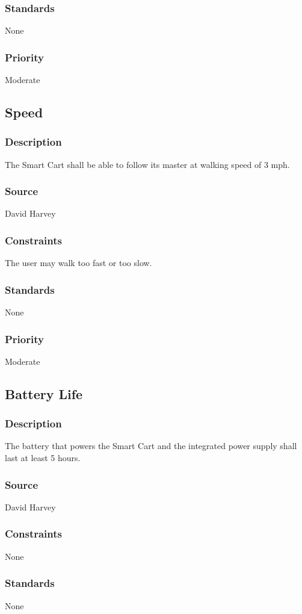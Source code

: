 \subsubsection{Standards}
None
\subsubsection{Priority}
Moderate


\subsection{Speed}
\subsubsection{Description}
The Smart Cart shall be able to follow its master at walking speed of 3 mph. 
\subsubsection{Source}
David Harvey
\subsubsection{Constraints}
The user may walk too fast or too slow. 
\subsubsection{Standards}
None
\subsubsection{Priority}
Moderate


\subsection{Battery Life}
\subsubsection{Description}
The battery that powers the Smart Cart and the integrated power supply shall last at least 5 hours.
\subsubsection{Source}
David Harvey
\subsubsection{Constraints}
None
\subsubsection{Standards}
None
